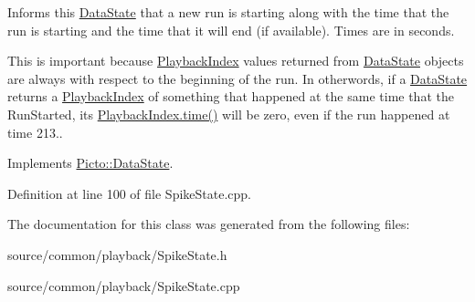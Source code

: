 Informs this \hyperlink{class_picto_1_1_data_state}{Data\-State} that a new run is starting along with the time that the run is starting and the time that it will end (if available). Times are in seconds. 

This is important because \hyperlink{struct_picto_1_1_playback_index}{Playback\-Index} values returned from \hyperlink{class_picto_1_1_data_state}{Data\-State} objects are always with respect to the beginning of the run. In otherwords, if a \hyperlink{class_picto_1_1_data_state}{Data\-State} returns a \hyperlink{struct_picto_1_1_playback_index}{Playback\-Index} of something that happened at the same time that the Run\-Started, its \hyperlink{struct_picto_1_1_playback_index_acbf8f826cfd64d647a098ed165dd3999}{Playback\-Index.\-time()} will be zero, even if the run happened at time 213.. 

Implements \hyperlink{class_picto_1_1_data_state_a8338a5e0c034ccd190e2916e4d60a6e8}{Picto\-::\-Data\-State}.



Definition at line 100 of file Spike\-State.\-cpp.



The documentation for this class was generated from the following files\-:\begin{DoxyCompactItemize}
\item 
source/common/playback/Spike\-State.\-h\item 
source/common/playback/Spike\-State.\-cpp\end{DoxyCompactItemize}
